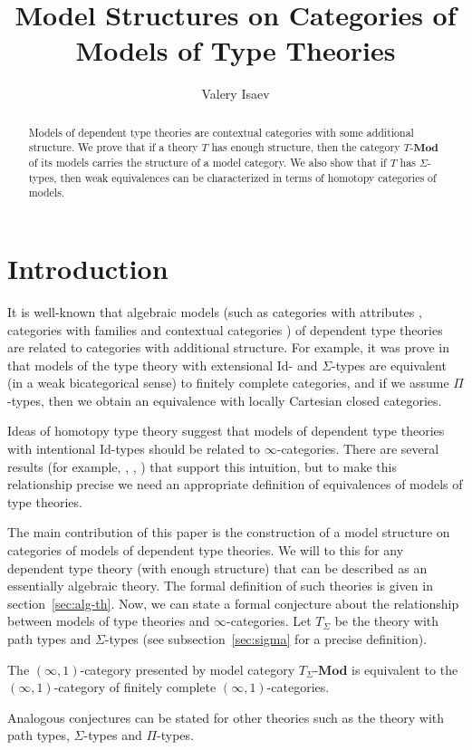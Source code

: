 \documentclass{mscs}
\title{Model Structures on Categories of Models of Type Theories}
\author{Valery Isaev}
\newcommand{\IdT}{\mathrm{Id}}
\newcommand{\cat}[1]{\mathbf{#1}}
\newcommand{\Mod}[1]{#1\text{-}\cat{Mod}}
\numberwithin{figure}{section}
\begin{document}
\maketitle

\begin{abstract}
Models of dependent type theories are contextual categories with some additional structure.
We prove that if a theory $T$ has enough structure, then the category $\Mod{T}$ of its models carries the structure of a model category.
We also show that if $T$ has $\Sigma$-types, then weak equivalences can be characterized in terms of homotopy categories of models.
\end{abstract}

\section{Introduction}

It is well-known that algebraic models (such as categories with attributes \cite{pitts}, categories with families \cite{cwf} and contextual categories \cite{GAT})
of dependent type theories are related to categories with additional structure.
For example, it was prove in \cite{ext-eq} that models of the type theory with extensional $\IdT$- and $\Sigma$-types are equivalent (in a weak bicategorical sense)
to finitely complete categories, and if we assume $\Pi$-types, then we obtain an equivalence with locally Cartesian closed categories.

Ideas of homotopy type theory suggest that models of dependent type theories with intentional $\IdT$-types should be related to $\infty$-categories.
There are several results (for example, \cite{shul-inv}, \cite{local-universes}, \cite{kapulkin}) that support this intuition,
but to make this relationship precise we need an appropriate definition of equivalences of models of type theories.

The main contribution of this paper is the construction of a model structure on categories of models of dependent type theories.
We will to this for any dependent type theory (with enough structure) that can be described as an essentially algebraic theory.
The formal definition of such theories is given in section~\ref{sec:alg-th}.
Now, we can state a formal conjecture about the relationship between models of type theories and $\infty$-categories.
Let $T_\Sigma$ be the theory with path types and $\Sigma$-types (see subsection~\ref{sec:sigma} for a precise definition).
\begin{conj}[main]
The $(\infty,1)$-category presented by model category $\Mod{T_\Sigma}$ is equivalent to the $(\infty,1)$-category of finitely complete $(\infty,1)$-categories.
\end{conj}
Analogous conjectures can be stated for other theories such as the theory with path types, $\Sigma$-types and $\Pi$-types.
\end{document}
